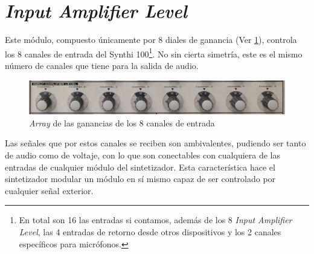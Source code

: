 \section[Input Amplifier Level]{\textit{Input Amplifier Level}}

Este módulo, compuesto únicamente por 8 diales de ganancia (Ver \ref{fig:input_amplifier_level}), controla los 8 canales de entrada del Synthi 100\footnote{En total son 16 las entradas si contamos, además de los 8 \textit{Input Amplifier Level}, las 4 entradas de retorno desde otros dispositivos y los 2 canales específicos para micrófonos.}. No sin cierta simetría, este es el mismo número de canales que tiene para la salida de audio. 

\begin{figure}
	\centering
	\includegraphics[width=1\textwidth]{images/input_amplifier_level}
	\caption[\textit{Input Amplifier Level}]{\textit{Array} de las ganancias de los 8 canales de entrada}
	\label{fig:input_amplifier_level}
\end{figure}

Las señales que por estos canales se reciben son ambivalentes, pudiendo ser tanto de audio como de voltaje, con lo que son conectables con cualquiera de las entradas de cualquier módulo del sintetizador. Esta característica hace el sintetizador modular un módulo en sí mismo capaz de ser controlado por cualquier señal exterior. 